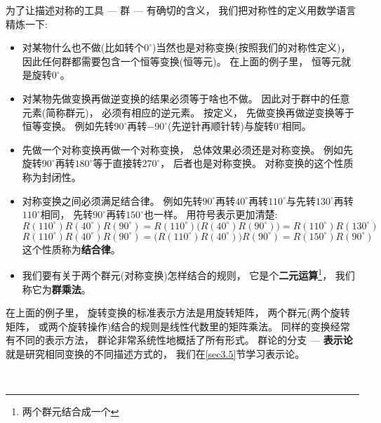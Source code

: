为了让描述对称的工具 --- 群 --- 有确切的含义， 我们把对称性的定义用数学语言精炼一下:
\begin{itemize}
	\item 对某物什么也不做(比如转个$0^\circ$)当然也是对称变换(按照我们的对称性定义)， 因此任何群都需要包含一个恒等变换(恒等元)。 在上面的例子里， 恒等元就是旋转$0^\circ$。

	\item 对某物先做变换再做逆变换的结果必须等于啥也不做。 因此对于群中的任意元素(简称群元)， 必须有相应的逆元素。 按定义， 先做变换再做逆变换等于恒等变换。 例如先转$90^\circ$再转$-90^\circ$(先逆针再顺针转)与旋转$0^\circ$相同。

	\item 先做一个对称变换再做一个对称变换， 总体效果必须还是对称变换。 例如先旋转$90^\circ$再转$180^\circ$等于直接转$270^\circ$， 后者也是对称变换。 对称变换的这个性质称为封闭性。

	\item 对称变换之间必须满足结合律。 例如先转$90^\circ$再转$40^\circ$再转$110^\circ$与先转$130^\circ$再转$110^\circ$相同， 先转$90^\circ$再转$150^\circ$也一样。 用符号表示更加清楚:
	\begin{equation}\label{equ3.1}
	R(110^\circ) R(40^\circ) R(90^\circ) = R(110^\circ)\bigg( R(40^\circ)R(90^\circ) \bigg) = R(110^\circ) R(130^\circ)
	\end{equation}
	\begin{equation}\label{equ3.2}
	R(110^\circ) R(40^\circ) R(90^\circ) = \bigg( R(110^\circ) R(40^\circ) \bigg) R(90^\circ) = R(150^\circ) R(90^\circ)
	\end{equation}
	这个性质称为{\bf 结合律}。

	\item 我们要有关于两个群元(对称变换)怎样结合的规则， 它是个{\bf 二元运算}\footnote{两个群元结合成一个}， 我们称它为{\bf 群乘法}。
\end{itemize}

	在上面的例子里， 旋转变换的标准表示方法是用旋转矩阵， 两个群元(两个旋转矩阵， 或两个旋转操作)结合的规则是线性代数里的矩阵乘法。 同样的变换经常有不同的表示方法， 群论非常系统性地概括了所有形式。 群论的分支 --- {\bf 表示论}就是研究相同变换的不同描述方式的， 我们在\ref{sec3.5}节学习表示论。

\

